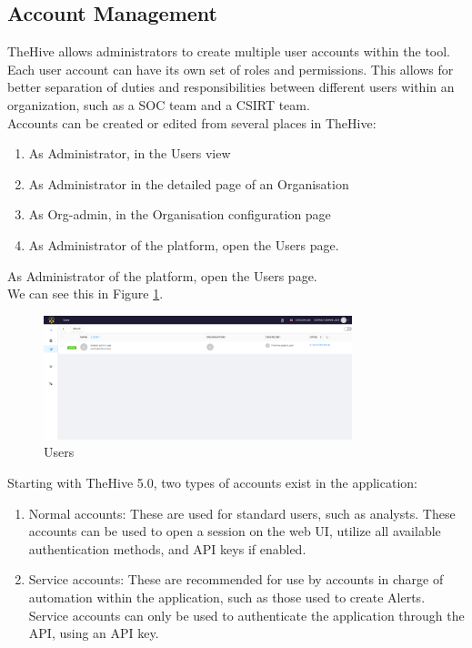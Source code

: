 \documentclass{article}
\begin{document}
\subsection{Account Management}
TheHive allows administrators to create multiple user accounts within the tool. Each user account can have its own set of roles and permissions. This allows for better separation of duties and responsibilities between different users within an organization, such as a SOC team and a CSIRT team.\\
Accounts can be created or edited from several places in TheHive:

\begin{enumerate}
  \item As Administrator, in the Users view
  \item As Administrator in the detailed page of an Organisation
  \item As Org-admin, in the Organisation configuration page
  \item As Administrator of the platform, open the Users page.
\end{enumerate}

As Administrator of the platform, open the Users page. \\
We can see this in Figure \ref{fig:users}.
\begin{figure}[h!]
    \centering
    \includegraphics[width=0.8\textwidth]{accounts1.png}
    \caption{Users}
    \label{fig:users}
\end{figure}

Starting with TheHive 5.0, two types of accounts exist in the application:

\begin{enumerate}
  \item Normal accounts: These are used for standard users, such as analysts. These accounts can be used to open a session on the web UI, utilize all available authentication methods, and API keys if enabled.
  
  \item Service accounts: These are recommended for use by accounts in charge of automation within the application, such as those used to create Alerts. Service accounts can only be used to authenticate the application through the API, using an API key.
\end{enumerate}
\end{document}
